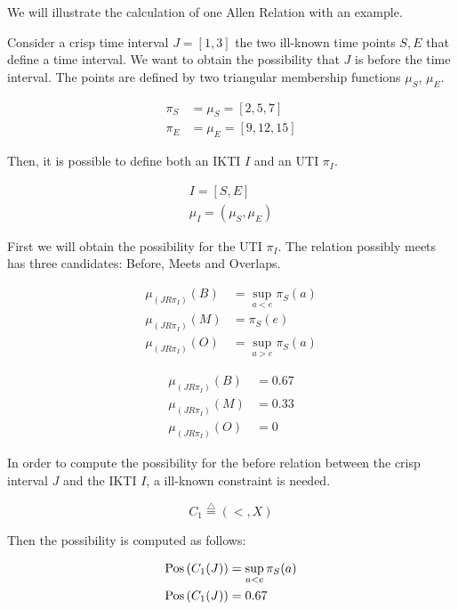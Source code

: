  
We will illustrate the calculation of one Allen Relation with an example.
\begin{example}
Consider a crisp time interval $J = [1, 3]$ the two ill-known time points $S, E$ that define a time interval. 
We want to obtain the possibility that $J$ is before the time interval.
The points are defined by two triangular membership functions $\mu_S$, $\mu_E$.

\begin{align}
\label{eq:ex-point}
\pi_S &= \mu_S = \left[2,5,7 \right] \\
\pi_E &= \mu_E = \left[9,12,15 \right]
\end{align}

Then, it is possible to define both an IKTI $I$ and an UTI $\pi_I$. 

\begin{align}
\label{eq:ex-uti-ikti}
I = \left[S, E \right]\\
\mu_I = \left(\mu_S, \mu_E \right)
\end{align}

First we will obtain the possibility for the UTI $\pi_I$. The relation possibly meets has three candidates: Before, Meets and Overlaps.

\begin{align}
  \mu_{\left(J R \pi_I \right)}(B) &= \sup_{a < e} \pi_S(a)\\
\mu_{\left(J R \pi_I \right)}(M) &= \pi_S(e)\\
\mu_{\left(J R \pi_I \right)}(O) &= \sup_{a > e} \pi_S(a)
\end{align}

\begin{align}
\mu_{\left(J R \pi_I \right)}(B) &= 0.67\\
\mu_{\left(J R \pi_I \right)}(M) &= 0.33\\
\mu_{\left(J R \pi_I \right)}(O) &= 0
\end{align}

In order to compute the possibility  for the before relation between the crisp interval $J$ and the IKTI $I$, a ill-known constraint is needed.

\begin{equation}
 C_1\stackrel{\triangle}{=} \left(<,X\right)
\end{equation}

Then the possibility is computed as follows:

\begin{align}
\operatorname{Pos} \left(C_1 (J) \right) &= \sup_{a < e} \pi_S(a)\\
\operatorname{Pos} \left(C_1 (J) \right) &= 0.67 
\end{align}






\end{example}



